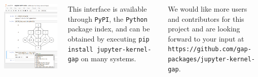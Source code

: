 \documentclass[14pt, a1paper, portrait, margin=0mm, innermargin=5mm, blockverticalspace=7mm, colspace=5mm, subcolspace=8mm]{tikzposter}
\begin{document}
\begin{columns}
{    \begin{tikzfigure}
      \includegraphics[width=15cm]{img/jupyter-demo-2.png}
    \end{tikzfigure}

    This interface is available through \texttt{PyPI}, the \texttt{Python}
    package index, and can be obtained by executing \texttt{pip install
      jupyter-kernel-gap} on many systems.

    \medskip

    We would like more users and contributors for this project and are looking
    forward to your input at \texttt{https://github.com/gap-packages/jupyter-kernel-gap}.
  } 
\end{columns}

\end{document}
